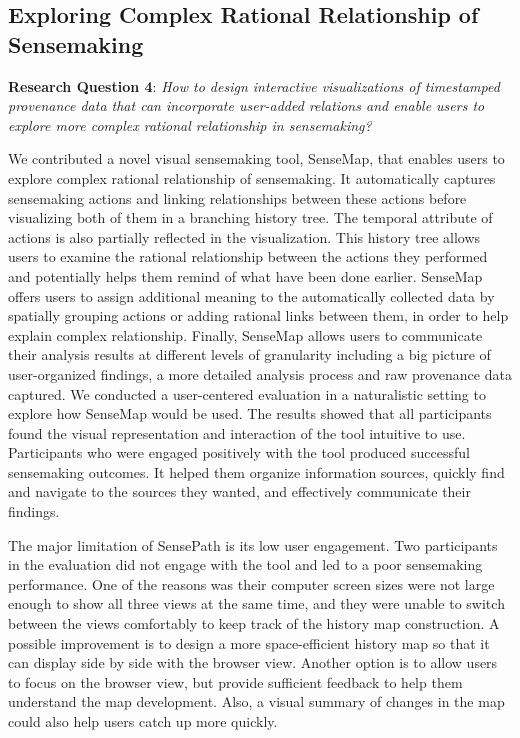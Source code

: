 \subsection{Exploring Complex Rational Relationship of Sensemaking}
\textbf{Research Question 4}: \emph{How to design interactive visualizations of timestamped provenance data that can incorporate user-added relations and enable users to explore more complex rational relationship in sensemaking?}

We contributed a novel visual sensemaking tool, SenseMap, that enables users to explore complex rational relationship of sensemaking. It automatically captures sensemaking actions and linking relationships between these actions before visualizing both of them in a branching history tree. The temporal attribute of actions is also partially reflected in the visualization. This history tree allows users to examine the rational relationship between the actions they performed and potentially helps them remind of what have been done earlier. SenseMap offers users to assign additional meaning to the automatically collected data by spatially grouping actions or adding rational links between them, in order to help explain complex relationship. Finally, SenseMap allows users to communicate their analysis results at different levels of granularity including a big picture of user-organized findings, a more detailed analysis process and raw provenance data captured. We conducted a user-centered evaluation in a naturalistic setting to explore how SenseMap would be used. The results showed that all participants found the visual representation and interaction of the tool intuitive to use. Participants who were engaged positively with the tool produced successful sensemaking outcomes. It helped them organize information sources, quickly find and navigate to the sources they wanted, and effectively communicate their findings.

The major limitation of SensePath is its low user engagement. Two participants in the evaluation did not engage with the tool and led to a poor sensemaking performance. One of the reasons was their computer screen sizes were not large enough to show all three views at the same time, and they were unable to switch between the views comfortably to keep track of the history map construction. A possible improvement is to design a more space-efficient history map so that it can display side by side with the browser view. Another option is to allow users to focus on the browser view, but provide sufficient feedback to help them understand the map development. Also, a visual summary of changes in the map could also help users catch up more quickly.

